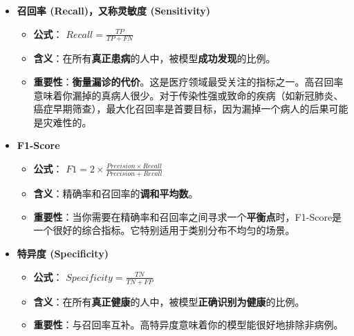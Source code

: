 \documentclass[a4paper, oneside, 12pt]{article}
\begin{document}
\begin{aireport}
{\begin{itemize}
        \item \textbf{召回率 (Recall)，又称灵敏度 (Sensitivity)}
        \begin{itemize}
            \item \textbf{公式}： $Recall = \frac{TP}{TP + FN}$
            \item \textbf{含义}：在所有\textbf{真正患病}的人中，被模型\textbf{成功发现}的比例。
            \item \textbf{重要性}：\textbf{衡量漏诊的代价}。这是医疗领域最受关注的指标之一。高召回率意味着你漏掉的真病人很少。对于传染性强或致命的疾病（如新冠肺炎、癌症早期筛查），最大化召回率是首要目标，因为漏掉一个病人的后果可能是灾难性的。
        \end{itemize}

        \item \textbf{F1-Score}
        \begin{itemize}
            \item \textbf{公式}： $F1 = 2 \times \frac{Precision \times Recall}{Precision + Recall}$
            \item \textbf{含义}：精确率和召回率的\textbf{调和平均数}。
            \item \textbf{重要性}：当你需要在精确率和召回率之间寻求一个\textbf{平衡点}时，F1-Score是一个很好的综合指标。它特别适用于类别分布不均匀的场景。
        \end{itemize}

        \item \textbf{特异度 (Specificity)}
        \begin{itemize}
            \item \textbf{公式}： $Specificity = \frac{TN}{TN + FP}$
            \item \textbf{含义}：在所有\textbf{真正健康}的人中，被模型\textbf{正确识别为健康}的比例。
            \item \textbf{重要性}：与召回率互补。高特异度意味着你的模型能很好地排除非病例。
        \end{itemize}
    \end{itemize}

}
\end{aireport}
\end{document}
